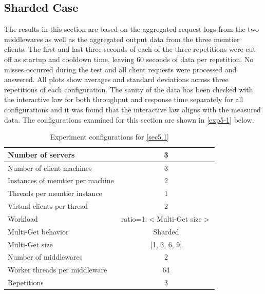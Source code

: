 \documentclass[11pt,a4paper]{article}
\begin{document}
\subsection{Sharded Case} \label{sec5.1}

The results in this section are based on the aggregated request logs from the two middlewares as well as the aggregated output data from the three memtier clients. The first and last three seconds of each of the three repetitions were cut off as startup and cooldown time, leaving 60 seconds of data per repetition. No misses occurred during the test and all client requests were processed and answered. All plots show averages and standard deviations across three repetitions of each configuration. The sanity of the data has been checked with the interactive law for both throughput and response time separately for all configurations and it was found that the interactive law aligns with the measured data. The configurations examined for this section are shown in \autoref{exp5-1} below.


\begin{center}
    \begin{table}
        \centering
    	\begin{tabular}{|l|c|}
    		\hline Number of servers                & 3                       \\ 
    		\hline Number of client machines        & 3                       \\ 
    		\hline Instances of memtier per machine & 2                       \\ 
    		\hline Threads per memtier instance     & 1                       \\
    		\hline Virtual clients per thread       & 2     		            \\ 
    		\hline Workload                         & ratio=1:$<$Multi-Get size$>$             \\
    		\hline Multi-Get behavior               & Sharded                 \\
    		\hline Multi-Get size                   & [1, 3, 6, 9]            \\
    		\hline Number of middlewares            & 2                       \\
    		\hline Worker threads per middleware    & 64                      \\
    		\hline Repetitions                      & 3                       \\ 
    		\hline 
    	\end{tabular}
    	\caption{Experiment configurations for \autoref{sec5.1}} \label{exp5-1}
    \end{table}
\end{center}
\end{document}
